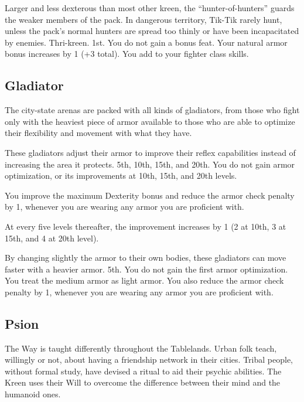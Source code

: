 {Larger and less dexterous than most other kreen, the ``hunter-of-hunters'' guards the weaker members of the pack. In dangerous territory, Tik-Tik rarely hunt, unless the pack's normal hunters are spread too thinly or have been incapacitated by enemies.}
{Thri-kreen.}
{1st.}
{You do not gain a bonus feat.}
{
	Your natural armor bonus increases by 1 (+3 total). You add  to your fighter class skills.
}


\subsection{Gladiator}
The city-state arenas are packed with all kinds of gladiators, from those who fight only with the heaviest piece of armor available to those who are able to optimize their flexibility and movement with what they have.

{These gladiators adjust their armor to improve their reflex capabilities instead of increasing the area it protects.}
{}
{5th, 10th, 15th, and 20th.}
{You do not gain armor optimization, or its improvements at 10th, 15th, and 20th levels.}
{
	You improve the maximum Dexterity bonus and reduce the armor check penalty by 1, whenever you are wearing any armor you are proficient with.

	At every five levels thereafter, the improvement increases by 1 (2 at 10th, 3 at 15th, and 4 at 20th level).
}
{By changing slightly the armor to their own bodies, these gladiators can move faster with a heavier armor.}
{}
{5th.}
{You do not gain the first armor optimization.}
{
	You treat the medium armor as light armor. You also reduce the armor check penalty by 1, whenever you are wearing any armor you are proficient with.
}


\subsection{Psion}
The Way is taught differently throughout the Tablelands. Urban folk teach, willingly or not, about having a friendship network in their cities. Tribal people, without formal study, have devised a ritual to aid their psychic abilities. The Kreen uses their Will to overcome the difference between their mind and the humanoid ones.

